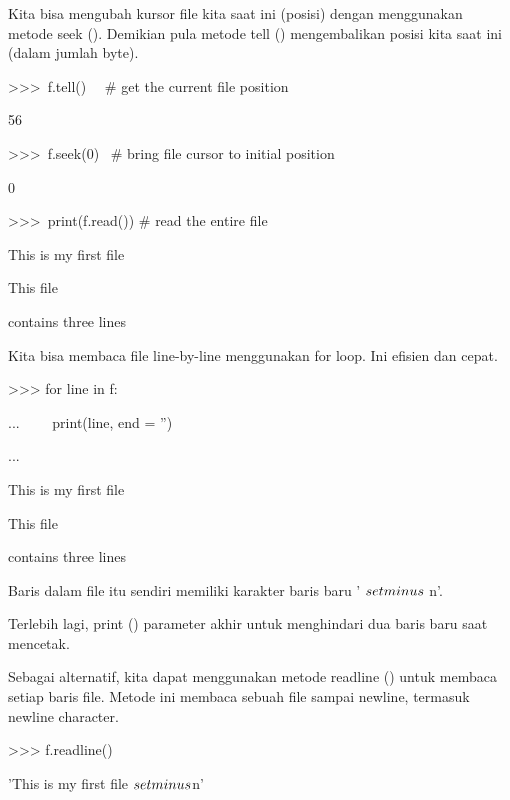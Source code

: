\vspace{12pt}
Kita bisa mengubah kursor file kita saat ini (posisi) dengan menggunakan metode seek (). Demikian pula metode tell () mengembalikan posisi kita saat ini (dalam jumlah byte). \par
\vspace{12pt}
>>>~f.tell()~~   $  \#  $ get the current file position \par
56 \par
\vspace{12pt}
>>>~f.seek(0)~   $  \#  $ bring file cursor to initial position \par
0 \par
\vspace{12pt}
>>>~print(f.read())   $  \#  $ read the entire file \par
This is my first file \par
This file \par
contains three lines \par
\vspace{12pt}
\vspace{12pt}
Kita bisa membaca file line-by-line menggunakan for loop. Ini efisien dan cepat. \par
\vspace{12pt}
>>> for line in f: \par
...~~~~ print(line, end = '') \par
... \par
This is my first file \par
This file \par
contains three lines \par
\vspace{12pt}
\vspace{12pt}
Baris dalam file itu sendiri memiliki karakter baris baru ' $  \\setminus  $ n'. \par
\vspace{12pt}
Terlebih lagi, print () parameter akhir untuk menghindari dua baris baru saat mencetak. \par
\vspace{12pt}
Sebagai alternatif, kita dapat menggunakan metode readline () untuk membaca setiap baris file. Metode ini membaca sebuah file sampai newline, termasuk newline character. \par
\vspace{12pt}
>>> f.readline() \par
'This is my first file $  \\setminus  $n' \par
